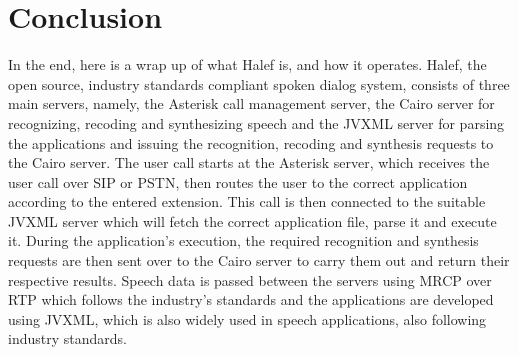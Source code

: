 \chapter{Conclusion}\label{chap:concl}

In the end, here is a wrap up of what Halef is, and how it operates.
Halef, the open source, industry standards compliant spoken dialog system, consists of three main servers, namely, the Asterisk call management server, the Cairo server for recognizing, recoding and synthesizing speech and the JVXML server for parsing the applications and issuing the recognition, recoding and synthesis requests to the Cairo server.
The user call starts at the Asterisk server, which receives the user call over SIP or PSTN, then routes the user to the correct application according to the entered extension.
This call is then connected to the suitable JVXML server which will fetch the correct application file, parse it and execute it.
During the application's execution, the required recognition and synthesis requests are then sent over to the Cairo server to carry them out and return their respective results.
Speech data is passed between the servers using MRCP over RTP which follows the industry's standards and the applications are developed using JVXML, which is also widely used in speech applications, also following industry standards.

